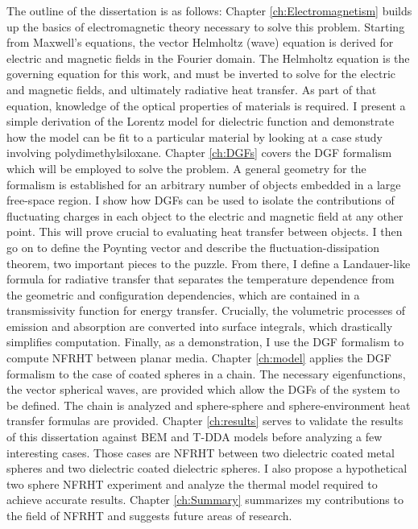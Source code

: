 The outline of the dissertation is as follows: Chapter \ref{ch:Electromagnetism} builds up the basics of electromagnetic theory necessary to solve this problem. Starting from Maxwell's equations, the vector Helmholtz (wave) equation is derived for electric and magnetic fields in the Fourier domain. The Helmholtz equation is the governing equation for this work, and must be inverted to solve for the electric and magnetic fields, and ultimately radiative heat transfer. As part of that equation, knowledge of the optical properties of materials is required. I present a simple derivation of the Lorentz model for dielectric function and demonstrate how the model can be fit to a particular material by looking at a case study involving polydimethylsiloxane. Chapter \ref{ch:DGFs} covers the DGF formalism which will be employed to solve the problem. A general geometry for the formalism is established for an arbitrary number of objects embedded in a large free-space region. I show how DGFs can be used to isolate the contributions of fluctuating charges in each object to the electric and magnetic field at any other point. This will prove crucial to evaluating heat transfer between objects. I then go on to define the Poynting vector and describe the fluctuation-dissipation theorem, two important pieces to the puzzle. From there, I define a Landauer-like formula for radiative transfer that separates the temperature dependence from the geometric and configuration dependencies, which are contained in a transmissivity function for energy transfer. Crucially, the volumetric processes of emission and absorption are converted into surface integrals, which drastically simplifies computation. Finally, as a demonstration, I use the DGF formalism to compute NFRHT between planar media. Chapter \ref{ch:model} applies the DGF formalism to the case of coated spheres in a chain. The necessary eigenfunctions, the vector spherical waves, are provided which allow the DGFs of the system to be defined. The chain is analyzed and sphere-sphere and sphere-environment heat transfer formulas are provided. Chapter \ref{ch:results} serves to validate the results of this dissertation against BEM and T-DDA models before analyzing a few interesting cases. Those cases are NFRHT between two dielectric coated metal spheres and two dielectric coated dielectric spheres. I also propose a hypothetical two sphere NFRHT experiment and analyze the thermal model required to achieve accurate results. Chapter \ref{ch:Summary} summarizes my contributions to the field of NFRHT and suggests future areas of research.

